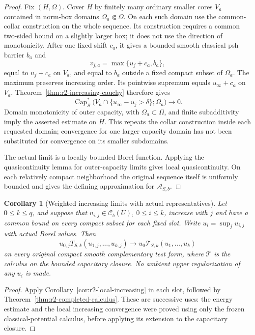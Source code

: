 \documentclass[11pt,a4paper]{article}
\numberwithin{equation}{section}
\newtheorem{corollary}[theorem]{Corollary}
\theoremstyle{definition}
\theoremstyle{remark}
\newcommand{\Cb}{\mathcal C_b}
\begin{document}
\begin{proof}
Fix $(H,\Omega)$. Cover $H$ by finitely many ordinary smaller cores
$V_a$ contained in norm-box domains $\Omega_a\Subset\Omega$.
On each such domain use the common-collar construction on the whole
sequence. Its construction requires a common two-sided bound on a
slightly larger box; it does not use the direction of monotonicity.
After one fixed shift $c_a$, it gives a bounded smooth classical psh
barrier $b_a$ and
\[
 v_{j,a}=\max\{u_j+c_a,b_a\},
\]
equal to $u_j+c_a$ on $V_a$, and equal to $b_a$ outside a fixed
compact subset of $\Omega_a$. The maximum preserves increasing
order. Its pointwise supremum equals $u_\infty+c_a$ on $V_a$.
Theorem~\ref{thm:r2-increasing-cauchy} therefore gives
\[
 \operatorname{Cap}_S^*\bigl(
 V_a\cap\{u_\infty-u_j>\delta\};\Omega_a\bigr)
       \longrightarrow0.
\]
Domain monotonicity of outer capacity, with
$\Omega_a\subset\Omega$, and finite subadditivity imply the
asserted estimate on $H$. This repeats the collar construction
inside each requested domain; convergence for one larger capacity
domain has not been substituted for convergence on its smaller
subdomains.

The actual limit is a locally bounded Borel function. Applying the
quasicontinuity lemma for outer-capacity limits gives local
quasicontinuity. On each relatively compact neighborhood the
original sequence itself is uniformly bounded and gives the
defining approximation for $\mathcal A_{S,b}$.
\end{proof}

\begin{corollary}[Weighted increasing limits with actual representatives]
\label{cor:r2-increasing-weighted}
Let $0\leq k\leq q$, and suppose that
$u_{i,j}\in\Cb(U)$, $0\leq i\leq k$, increase with $j$ and
have a common bound on every compact subset for each fixed slot.
Write $u_i=\sup_j u_{i,j}$ with actual Borel values. Then
\[
 u_{0,j}T_{S,k}(u_{1,j},\ldots,u_{k,j})
   \longrightarrow
 u_0\mathcal T_{S,k}(u_1,\ldots,u_k)
\]
on every original compact smooth complementary test form, where
$\mathcal T$ is the calculus on the bounded capacitary closure.
No ambient upper regularization of any $u_i$ is made.
\end{corollary}

\begin{proof}
Apply Corollary~\ref{cor:r2-local-increasing} in each slot, followed
by Theorem~\ref{thm:r2-completed-calculus}. These are successive
uses: the energy estimate and the local increasing convergence were
proved using only the frozen classical-potential calculus, before
applying its extension to the capacitary closure.
\end{proof}
\end{document}
